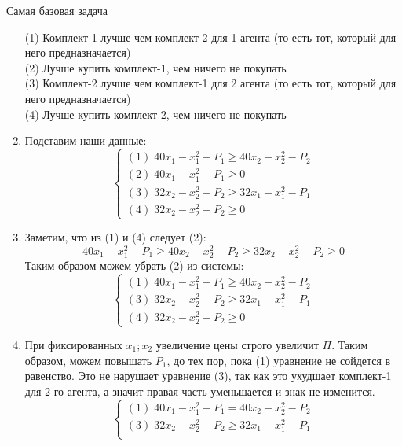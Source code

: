 \begin{mybox}{Самая базовая задача}
\begin{enumerate}
\begin{equation*}
        \end{equation*}
        (1) Комплект-1 лучше чем комплект-2 для 1 агента (то есть тот, который для него предназначается)\\
        (2) Лучше купить комплект-1, чем ничего не покупать\\
        (3) Комплект-2 лучше чем комплект-1 для 2 агента (то есть тот, который для него предназначается)\\
        (4) Лучше купить комплект-2, чем ничего не покупать
        \item Подставим наши данные:
        \begin{equation*}
         \begin{cases}
           (1)\;40x_1-x_1^2-P_1\geq 40x_2-x_2^2-P_2
           \\
           (2)\;40x_1-x_1^2-P_1\geq 0
           \\
           (3)\;32x_2-x_2^2-P_2\geq 32x_1-x_1^2-P_1
           \\
           (4)\;32x_2-x_2^2-P_2\geq 0
         \end{cases}
        \end{equation*}
        \item Заметим, что из (1) и (4) следует (2):
        $$40x_1-x_1^2-P_1\geq 40x_2-x_2^2-P_2\geq 32x_2-x_2^2-P_2\geq 0$$
        Таким образом можем убрать (2) из системы:
        \begin{equation*}
         \begin{cases}
           (1)\;40x_1-x_1^2-P_1\geq 40x_2-x_2^2-P_2
           \\
           (3)\;32x_2-x_2^2-P_2\geq 32x_1-x_1^2-P_1
           \\
           (4)\;32x_2-x_2^2-P_2\geq 0
         \end{cases}
        \end{equation*}
        \item При фиксированных $x_1;x_2$ увеличение цены строго увеличит $\Pi$. Таким образом, можем повышать $P_1$, до тех пор, пока (1) уравнение не сойдется в равенство. Это не нарушает уравнение (3), так как это ухудшает комплект-1 для 2-го агента, а значит правая часть уменьшается и знак не изменится.
        \begin{equation*}
         \begin{cases}
           (1)\;40x_1-x_1^2-P_1= 40x_2-x_2^2-P_2
           \\
           (3)\;32x_2-x_2^2-P_2\geq 32x_1-x_1^2-P_1
           \\

\end{cases}
\end{equation*}
\end{enumerate}
\end{mybox}
